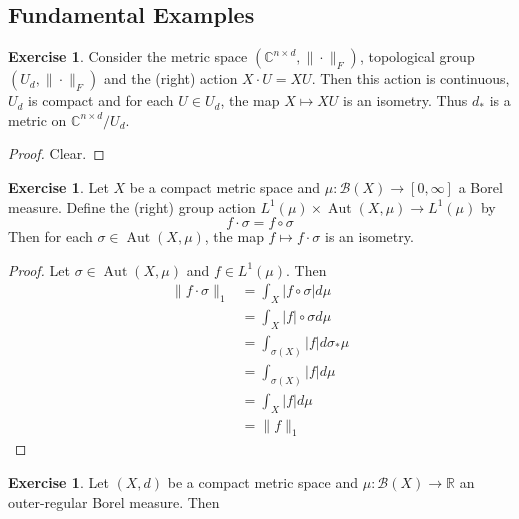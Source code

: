 \documentclass[12pt]{amsart}
\theoremstyle{definition}
\newtheorem{ex}[definition]{Exercise}
\newcommand{\sig}{\sigma}
\newcommand{\C}{\mathbb{C}}
\newcommand{\R}{\mathbb{R}}
\newcommand{\MB}{\mathcal{B}}
\newcommand{\RG}{[0,\infty]}
\DeclareMathOperator{\Aut}{Aut}
\begin{document}
	
	
	
	
	
	
	
	
	
	
	\newpage
	\subsection{Fundamental Examples}
	\begin{ex}
	Consider the metric space $(\C^{n \times d}, \|\cdot\|_F)$, topological group $(U_d, \|\cdot\|_F)$ and  the (right) action $X \cdot U = XU$. Then this action is continuous, $U_d$ is compact and for each $U \in U_d$, the map $X \mapsto XU$ is an isometry. Thus $d_*$ is a metric on $\C^{n \times d}/ U_d$.
	\end{ex}
	
	\begin{proof}
	Clear.
	\end{proof}		
	
	\begin{ex}
	Let $X$ be a compact metric space and $\mu:\MB(X) \rightarrow \RG$ a Borel measure. Define the (right) group action $L^1(\mu) \times \Aut(X, \mu) \rightarrow L^1(\mu) $ by $$f \cdot \sig = f \circ \sig$$ Then for each $\sig \in \Aut(X, \mu)$, the map $f \mapsto f \cdot \sig$ is an isometry. 
	\end{ex}
	
	\begin{proof}
	Let $\sig \in \Aut(X, \mu)$ and $f \in L^1(\mu)$. 
Then 
	\begin{align*}
	\|f \cdot \sig\|_1
	&=  \int_X |f \circ \sig| d\mu \\
	&=  \int_X |f| \circ \sig d\mu \\
	&=  \int_{\sig(X)} |f| d \sig_* \mu  \\
	&=  \int_{\sig(X)} |f| d \mu \\
	&=  \int_{X} |f| d \mu \\
	&= \|f\|_1 
	\end{align*}	 
	\end{proof}
	
	\begin{ex}
	Let $(X,d)$ be a compact metric space and $\mu: \MB(X) \rightarrow \R$ an outer-regular Borel measure. Then 
	\end{ex}
	
	
	
	
	
	
	
	
	
\end{document}
